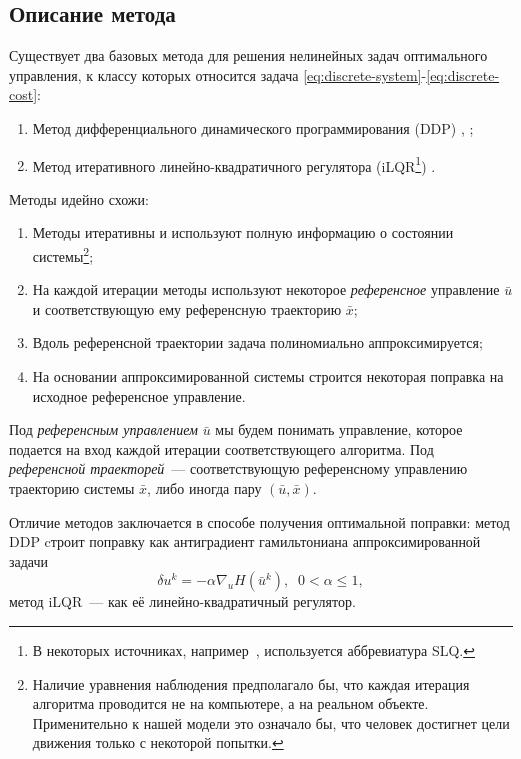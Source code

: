 \documentclass[../../doc.tex]{subfiles}
\begin{document}
    \subsection{Описание метода}

    Существует два базовых метода для решения нелинейных задач оптимального управления, к классу которых относится задача \eqref{eq:discrete-system}-\eqref{eq:discrete-cost}:
    \begin{enumerate}\itemsep0em
        \item Метод дифференциального динамического программирования (DDP) \cite{mayne1966}, \cite{murray1984};
        \item Метод итеративного линейно-квадратичного регулятора (iLQR\footnote{В некоторых источниках, например~\cite{sideris2005}, используется аббревиатура SLQ.}) \cite{li2004}.
    \end{enumerate}
    Методы идейно схожи:
    \begin{enumerate}\itemsep0em
        \item Методы итеративны и используют полную информацию о состоянии системы\footnote{Наличие уравнения наблюдения предполагало бы, что каждая итерация алгоритма проводится не на компьютере, а на реальном объекте. Применительно к нашей модели это означало бы, что человек достигнет цели движения только с некоторой попытки.};
        \item На каждой итерации методы используют некоторое \textit{референсное} управление $\bar u$ и соответствующую ему референсную траекторию $\bar x$;
        \item Вдоль референсной траектории задача полиномиально аппроксимируется;
        \item На основании аппроксимированной системы строится некоторая поп\-равка на исходное референсное управление.
    \end{enumerate}

    \begin{definition}
        Под \textit{референсным управлением} $\bar u$ мы будем понимать управление, которое подается на вход каждой итерации соответствующего алгоритма.
        Под \textit{референсной траекторей}~--- соответствующую референсному управлению траекторию системы $\bar x$, либо иногда пару $(\bar u, \bar x)$.
    \end{definition}

    Отличие методов заключается в способе получения оптимальной поправки:
    метод DDP cтроит поправку как антиградиент гамильтониана аппроксимированной задачи
    $$
        \delta u^k = -\alpha \nabla_u H(\bar u^k),\;\; 0 < \alpha \leqslant 1,
    $$
    метод iLQR~--- как её линейно-квадратичный регулятор.
\end{document}
